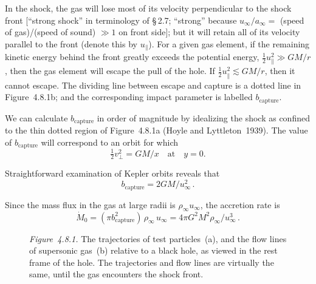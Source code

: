 In the shock, the gas will lose most of its velocity perpendicular to the shock
front [``strong shock'' in terminology of \S\,2.7; ``strong'' because $u_\infty/a_\infty ={}$
(speed of gas)/(speed of sound) $\gg 1$ on front side]; but it will retain all of its
velocity parallel to the front (denote this by $u_\|$). For a given gas element, if the
remaining kinetic energy behind the front greatly exceeds the potential energy,
$\frac{1}{2}u_\|^2 \gg GM/r$, then the gas element will escape the pull of the hole. If
$\frac{1}{2}u_\|^2 \lesssim GM/r$, then it cannot escape. The dividing line between escape and
capture is a dotted line in Figure~4.8.1b; and the corresponding impact parameter
is labelled $b_\text{capture}$.

We can calculate $b_\text{capture}$ in order of magnitude by idealizing the shock as
confined to the thin dotted region of Figure~4.8.1a (Hoyle and Lyttleton~1939)\cite{HoyleLyttleton1939}.
The value of $b_\text{capture}$ will correspond to an orbit for which
\begin{equation}
\tfrac{1}{2}v_\perp^2 = GM/x \quad \text{at}\quad y = 0.
\end{equation}

Straightforward examination of Kepler orbits reveals that
\begin{equation}
b_\text{capture} = 2GM/u_\infty^2\,.
\tag{4.8.3}
\end{equation}

Since the mass flux in the gas at large radii is $\rho_\infty u_\infty$, the accretion rate is
\begin{equation}
\dot{M}_0 = (\pi b_\text{capture}^2)\,\rho_\infty\, u_\infty
= 4\pi G^2 M^2 \rho_\infty / u_\infty^3\,.
\tag{4.8.4}
\end{equation}

\begin{figure}[htbp]
\centering
\caption{\textit{Figure~4.8.1.} The trajectories of test particles~(a), and the flow lines
of supersonic gas~(b) relative to a black hole, as viewed in the rest frame of the hole.
The trajectories and flow lines are virtually the same, until the gas encounters the
shock front.}
\label{fig:4.8.1}
\end{figure}

